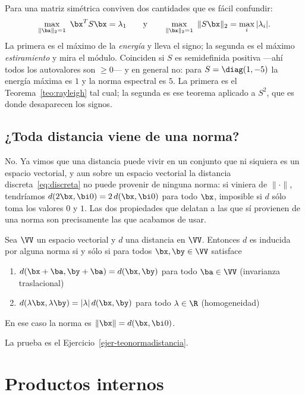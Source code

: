 \begin{remark}\label{obs:dos-maximos}
Para una matriz simétrica conviven dos cantidades que es fácil confundir:
\[
\max_{\|\bx\|_2=1}\ \bx^TS\bx=\lambda_1
\qquad\text{y}\qquad
\max_{\|\bx\|_2=1}\ \|S\bx\|_2=\max_i|\lambda_i| .
\]
La primera es el máximo de la \emph{energía} y lleva el signo; la segunda es
el máximo \emph{estiramiento} y mira el módulo. Coinciden si $S$ es
semidefinida positiva ---ahí todos los autovalores son $\ge0$--- y en
general no: para $S=\diag(1,-5)$ la energía máxima es $1$ y la norma
espectral es $5$. La primera es el Teorema~\ref{teo:rayleigh} tal cual; la
segunda es ese teorema aplicado a $S^2$, que es donde desaparecen los signos.
\end{remark}

\subsection{¿Toda distancia viene de una norma?}

No. Ya vimos que una distancia puede vivir en un conjunto que ni siquiera es
un espacio vectorial, y aun sobre un espacio vectorial la distancia
discreta~\eqref{eq:discreta} no puede provenir de ninguna norma: si viniera
de $\|\cdot\|$, tendríamos $d(2\bx,\bi 0)=2\,d(\bx,\bi 0)$ para todo $\bx$,
imposible si $d$ sólo toma los valores $0$ y $1$. Las dos propiedades que
delatan a las que sí provienen de una norma son precisamente las que acabamos
de usar.

\begin{thm}\label{teo-normasdistancias}
Sea $\VV$ un espacio vectorial y $d$ una distancia en $\VV$. Entonces $d$ es
inducida por alguna norma si y sólo si para todos $\bx,\by\in\VV$ satisface
\begin{enumerate}[label=\textup{(\alph*)}]
\item $d(\bx+\ba,\by+\ba)=d(\bx,\by)$ para todo $\ba\in\VV$
\hfill (invarianza traslacional) \label{itm:trasl}
\item $d(\lambda\bx,\lambda\by)=|\lambda|\,d(\bx,\by)$ para todo
$\lambda\in\R$ \hfill (homogeneidad) \label{itm:hom}
\end{enumerate}
En ese caso la norma es $\|\bx\|=d(\bx,\bi 0)$.
\end{thm}

La prueba es el Ejercicio~\ref{ejer-teonormadistancia}.

\section{Productos internos}
\label{sec:productos-internos}

